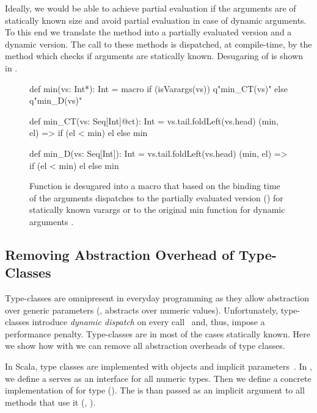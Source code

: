 Ideally, we would be able to achieve partial evaluation if the arguments are of statically
known size and avoid partial evaluation in case of dynamic arguments. To this end we translate
the method  into a partially evaluated version and a dynamic version. The call to these
methods is dispatched, at compile-time, by the  method which checks if
arguments are statically known. Desugaring of  is shown in .

\begin{figure}
\begin{listing}
def min(vs: Int*): Int = macro
  if (isVarargs(vs)) q"min_CT(vs)"
  else q"min_D(vs)"

def min_CT(vs: Seq[Int]@ct): Int =
  vs.tail.foldLeft(vs.head) { (min, el) =>
    if (el < min) el else min
  }

def min_D(vs: Seq[Int]): Int =
  vs.tail.foldLeft(vs.head) {
    (min, el) => if (el < min) el else min
  }
\end{listing}
\caption{Function  is desugared into a  macro that based on the
binding time of the arguments dispatches to the partially evaluated version ()
for statically known varargs or to the original min function for dynamic arguments .}
\label{fig:min}
\end{figure}

\subsection{Removing Abstraction Overhead of Type-Classes}
\label{sct:type-classes-removal}

Type-classes are omnipresent in everyday programming as they allow abstraction over
 generic parameters (\eg,  abstracts over numeric values). Unfortunately,
 type-classes introduce \emph{dynamic dispatch} on every call~\cite{rompf_optimizing_2013} and,
 thus, impose a performance penalty. Type-classes are in most of the cases statically known. Here
 we show how with \tool we can remove all abstraction overheads of type classes.

In Scala, type classes are implemented with objects and implicit parameters~\cite{oliveira_type_2010}.
In , we define a  serves as an interface for
all numeric types. Then we define a concrete implementation of  for
type  (). The  is than passed
as an implicit argument  to all methods that use it (\eg, ).

